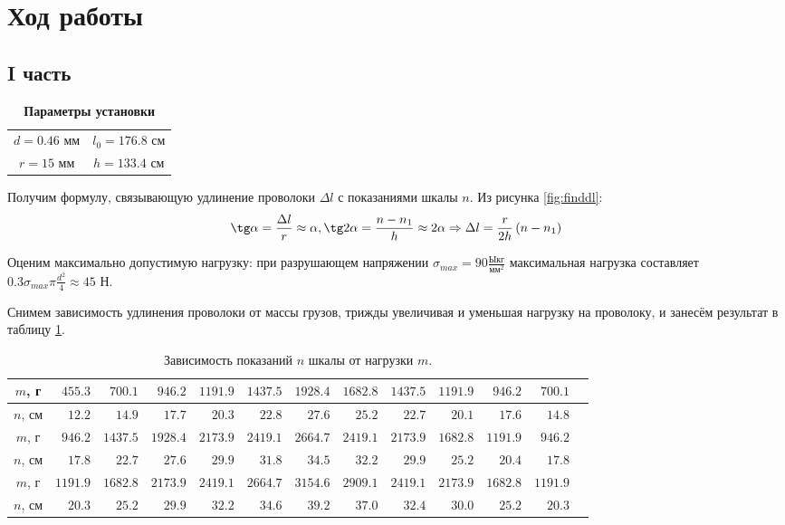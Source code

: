 \documentclass[a4paper, 10pt]{article}
\begin{document}
	\section{Ход работы}
		\subsection*{I часть}
			\begin{table}
				\vspace{-0.5cm}
				\centering
				\caption*{\textbf{Параметры установки}}
				\vspace{-0.25cm}
				\begin{tabular}{cc}
					$d = 0.46 \text{ мм}$ & $l_0 = 176.8 \text{ см}$ \\
					$r = 15 \text{ мм}$ & $h = 133.4 \text{ см}$ \\
				\end{tabular}
			\end{table}
	
			Получим формулу, связывающую удлинение проволоки $\Delta l$ с показаниями шкалы $n$. Из рисунка \ref{fig:finddl}:
			\[\tg\alpha = \frac{\Delta l}{r} \approx \alpha, \tg2\alpha = \frac{n - n_1}{h} \approx 2\alpha \Rightarrow \Delta l = \frac{r}{2h}\left(n - n_1\right)\]
			
			Оценим максимально допустимую нагрузку: при разрушающем напряжении $\sigma_{max} = 90 \frac{Ы\text{кг}}{\text{мм}^2}$ максимальная нагрузка составляет $0.3\sigma_{max}\pi \frac{d^2}{4} \approx 45 \text{ Н}$.
			
			Снимем зависимость удлинения проволоки от массы грузов, трижды увеличивая и уменьшая нагрузку на проволоку, и занесём результат в таблицу \ref{table:n(m)}.
					
			\begin{table}[h]
				\caption{Зависимость показаний $n$ шкалы от нагрузки $m$.}
				\label{table:n(m)}
				\begin{tabular}{|c|r|r|r|r|r|r||r|r|r|r|r|r|}
					\hline
					$m$, г & $455.3$ & $700.1$ & $946.2$ & $1191.9$ & $1437.5$ & $1928.4$ & $1682.8$ & $1437.5$ & $1191.9$ & $946.2$ & $700.1$ \\
					\hline
					$n$, см & $12.2$ & $14.9$ & $17.7$ & $20.3$ & $22.8$ & $27.6$ & $25.2$ & $22.7$ & $20.1$ & $17.6$ & $14.8$ \\
					\hline \hline
					$m$, г & $946.2$ & $1437.5$ & $1928.4$ & $2173.9$ & $2419.1$ & $2664.7$ & $2419.1$ & $2173.9$ & $1682.8$ & $1191.9$ & $946.2$ \\
					\hline
					$n$, см & $17.8$ & $22.7$ & $27.6$ & $29.9$ & $31.8$ & $34.5$ & $32.2$ & $29.9$ & $25.2$ & $20.4$ & $17.8$ \\
					\hline \hline
					$m$, г & $1191.9$ & $1682.8$ & $2173.9$ & $2419.1$ & $2664.7$ & $3154.6$ & $2909.1$ & $2419.1$ & $2173.9$ & $1682.8$ & $1191.9$ \\
					\hline
					$n$, см & $20.3$ & $25.2$ & $29.9$ & $32.2$ & $34.6$ & $39.2$ & $37.0$ & $32.4$ & $30.0$ & $25.2$ & $20.3$ \\
					\hline
				\end{tabular}
			\end{table}
			
\end{document}
